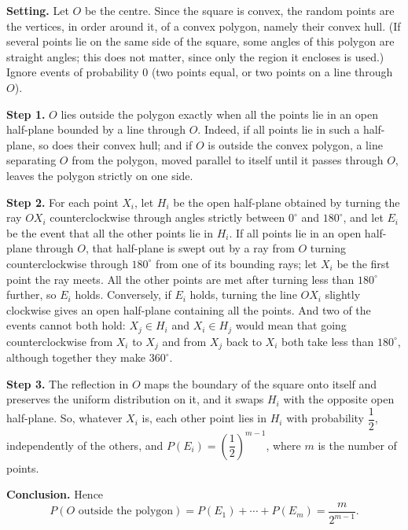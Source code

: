 \textbf{Setting.} Let $O$ be the centre. Since the square is convex, the random points are the vertices, in order around it, of a convex polygon, namely their convex hull. (If several points lie on the same side of the square, some angles of this polygon are straight angles; this does not matter, since only the region it encloses is used.) Ignore events of probability $0$ (two points equal, or two points on a line through $O$).

\textbf{Step 1.} $O$ lies outside the polygon exactly when all the points lie in an open half-plane bounded by a line through $O$. Indeed, if all points lie in such a half-plane, so does their convex hull; and if $O$ is outside the convex polygon, a line separating $O$ from the polygon, moved parallel to itself until it passes through $O$, leaves the polygon strictly on one side.

\textbf{Step 2.} For each point $X_i$, let $H_i$ be the open half-plane obtained by turning the ray $OX_i$ counterclockwise through angles strictly between $0^\circ$ and $180^\circ$, and let $E_i$ be the event that all the other points lie in $H_i$. If all points lie in an open half-plane through $O$, that half-plane is swept out by a ray from $O$ turning counterclockwise through $180^\circ$ from one of its bounding rays; let $X_i$ be the first point the ray meets. All the other points are met after turning less than $180^\circ$ further, so $E_i$ holds. Conversely, if $E_i$ holds, turning the line $OX_i$ slightly clockwise gives an open half-plane containing all the points. And two of the events cannot both hold: $X_j\in H_i$ and $X_i\in H_j$ would mean that going counterclockwise from $X_i$ to $X_j$ and from $X_j$ back to $X_i$ both take less than $180^\circ$, although together they make $360^\circ$.

\textbf{Step 3.} The reflection in $O$ maps the boundary of the square onto itself and preserves the uniform distribution on it, and it swaps $H_i$ with the opposite open half-plane. So, whatever $X_i$ is, each other point lies in $H_i$ with probability $\dfrac12$, independently of the others, and $P(E_i)=\left(\dfrac12\right)^{m-1}$, where $m$ is the number of points.

\textbf{Conclusion.} Hence
\[P(O\text{ outside the polygon})=P(E_1)+\cdots+P(E_m)=\dfrac{m}{2^{m-1}}.\]

